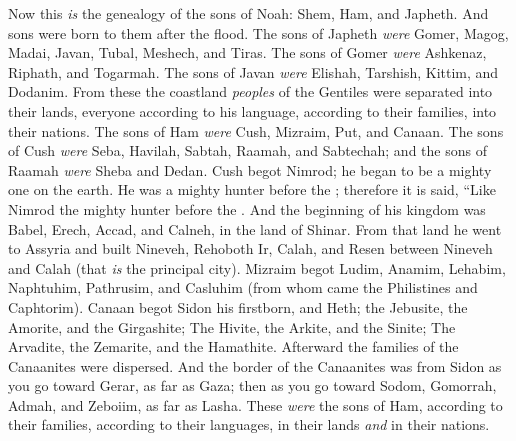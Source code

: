 
\bverse Now this \textit{is} the genealogy of the sons of Noah: Shem, Ham, and Japheth. And sons were born to them after the flood.
\bverse The sons of Japheth \textit{were} Gomer, Magog, Madai, Javan, Tubal, Meshech, and Tiras.
\bverse The sons of Gomer \textit{were} Ashkenaz, Riphath, and Togarmah.
\bverse The sons of Javan \textit{were} Elishah, Tarshish, Kittim, and Dodanim.
\bverse From these the coastland \textit{peoples} of the Gentiles were separated into their lands, everyone according to his language, according to their families, into their nations.
\bverse The sons of Ham \textit{were} Cush, Mizraim, Put, and Canaan.
\bverse The sons of Cush \textit{were} Seba, Havilah, Sabtah, Raamah, and Sabtechah; and the sons of Raamah \textit{were} Sheba and Dedan.
\bverse Cush begot Nimrod; he began to be a mighty one on the earth.
\bverse He was a mighty hunter before the \lord; therefore it is said, ``Like Nimrod the mighty hunter before the \lord.
\bverse And the beginning of his kingdom was Babel, Erech, Accad, and Calneh, in the land of Shinar.
\bverse From that land he went to Assyria and built Nineveh, Rehoboth Ir, Calah,
\bverse and Resen between Nineveh and Calah (that \textit{is} the principal city).
\bverse Mizraim begot Ludim, Anamim, Lehabim, Naphtuhim,
\bverse Pathrusim, and Casluhim (from whom came the Philistines and Caphtorim).
\bverse Canaan begot Sidon his firstborn, and Heth;
\bverse the Jebusite, the Amorite, and the Girgashite;
\bverse The Hivite, the Arkite, and the Sinite;
\bverse The Arvadite, the Zemarite, and the Hamathite. Afterward the families of the Canaanites were dispersed.
\bverse And the border of the Canaanites was from Sidon as you go toward Gerar, as far as Gaza; then as you go toward Sodom, Gomorrah, Admah, and Zeboiim, as far as Lasha.
\bverse These \textit{were} the sons of Ham, according to their families, according to their languages, in their lands \textit{and} in their nations.
\bverse 
\bverse 
\bverse 
\bverse 
\bverse 
\bverse 
\bverse 
\bverse 
\bverse 
\bverse 
\bverse 
\bverse 
